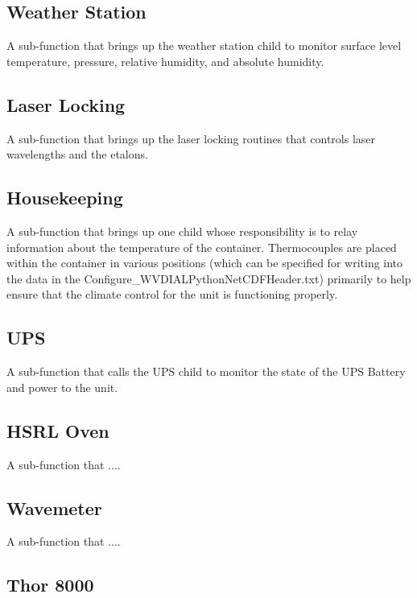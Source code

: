 \subsection{Weather Station}\label{Sec:WSSubFunction}

A sub-function that brings up the weather station child to monitor surface level temperature, pressure, relative humidity, and absolute humidity. 

\subsection{Laser Locking}\label{Sec:LLSubFunction}

A sub-function that brings up the laser locking routines that controls laser wavelengths and the etalons. 

\subsection{Housekeeping}\label{Sec:HousekeepingSubFunction}

A sub-function that brings up one child whose responsibility is to relay information about the temperature of the container. Thermocouples are placed within the container in various positions (which can be specified for writing into the data in the Configure\_WVDIALPythonNetCDFHeader.txt) primarily to help ensure that the climate control for the unit is functioning properly. 

\subsection{UPS}\label{Sec:UPSSubFunction}

A sub-function that calls the UPS child to monitor the state of the UPS Battery and power to the unit. 

\subsection{HSRL Oven}\label{Sec:HSRLOvenSubFunction}

A sub-function that ....

\subsection{Wavemeter}\label{Sec:WavemeterSubFunction}

A sub-function that ....

\subsection{Thor 8000}\label{Sec:T8000SubFunction}

